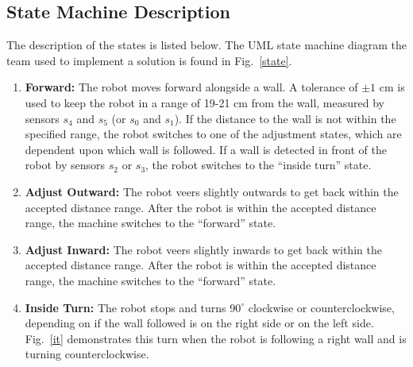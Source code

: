 \subsection{State Machine Description}

The description of the states is listed below. The UML state machine
diagram the team used to implement a solution is found in
Fig.~\ref{state}.

\begin{enumerate}
\item \textbf{Forward:} The robot moves forward alongside a
  wall. A tolerance of \(\pm1\) cm is used to keep the robot in a
  range of 19-21 cm from the wall, measured by sensors
  \(s_4\) and \(s_5\) (or  \(s_0\) and \(s_1\)).  If the distance to the
  wall is not within the specified range, the robot
  switches to one of the adjustment states, which are dependent upon
  which wall is followed.  If a wall is detected in front of the robot
  by sensors \(s_2\) or \(s_3\), the robot switches to the ``inside
  turn'' state. 
\item \textbf{Adjust Outward:} The robot veers slightly outwards to get
  back within the accepted distance range. After the robot is within
  the accepted distance range, the machine switches to the ``forward''
  state.
\item \textbf{Adjust Inward:} The robot veers slightly inwards to get
  back within the accepted distance range. After the robot is within
  the accepted distance range, the machine switches to the ``forward''
  state.
\item \textbf{Inside Turn:} The robot stops and turns \(90^\circ\) clockwise or
  counterclockwise, depending on if the wall followed is on the right
  side or on the left side. Fig.~\ref{it} demonstrates this turn when the
  robot is following a right wall and is turning counterclockwise.
\end{enumerate}

\begin{figure}[h!]
  \centering \cprotect {}
\end{figure}


